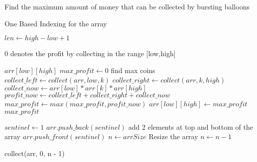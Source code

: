 \documentclass[12pt]{article}
\begin{document}
\begin{algorithm}

  \caption{Find the maximum amount of money that can be collected by bursting balloons}
\begin{algorithmic}[1]
    \Ensure One Based Indexing for the array
    \Statex
 
     
    \State $len \gets high-low+1$
    
 	 	\Return $0$
   \EndIf
    \Comment denotes the profit by collecting in the range [low,high]
  
  \Return     $arr[low][high]$
  \EndIf
    \State $max\_profit \gets 0$
     \Comment find max coins
    \Statex
            \State $collect\_ left \gets collect(arr,low,k)$
            \State $collect\_ right\gets collect(arr,k,high)$
            \State $collect\_ now \gets arr[low]*arr[k]*arr[high]$   
            \State $profit\_ now \gets collect\_ left+collect\_ right+collect\_ now$
            \State $max \_ profit \gets max(max\_ profit,profit\_ now)$
    \EndFor
    \State $arr[low][high] \gets max\_profit$ 
    \Statex
    \Return $max\_profit$
   \EndFunction
   \Statex
   \Statex
    
        \State $sentinel \gets 1$
        \State $arr.push\_back(sentinel)$		\Comment add 2 elements at top and bottom of the array
       \State $arr.push\_front(sentinel)$
  		\State $n \gets arrSize$                 \Comment Resize the array
    \State $n \gets n-1$                         
    \Statex
    
    \Return collect(arr, 0, n - 1)
    \EndFunction
  \end{algorithmic}
  
\end{algorithm}
\end{document}
